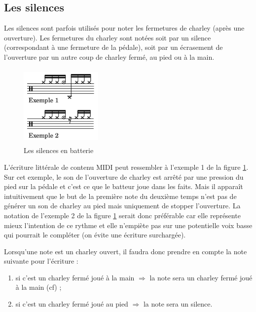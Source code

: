 \subsection*{Les silences}
Les silences sont parfois utilisés pour noter les fermetures de charley (après
une ouverture). Les fermetures du charley sont notées soit par un silence
(correspondant à une fermeture de la pédale), soit par un écrasement de
l’ouverture par un autre coup de charley fermé, au pied ou à la main.

\begin{figure}[h]
	\centering
	\includegraphics[height=40mm, width=40mm]{
    z_images/3_methodes/0_notation_de_la_batterie/5_silence_joue.png}
	\caption{Les silences en batterie}
	\label{silence joue}
\end{figure}

L’écriture littérale de contenu MIDI peut ressembler à l’exemple 1 de la figure
\ref{silence joue}. Sur cet exemple, le son de l’ouverture de charley est
arrêté par une pression du pied sur la pédale et c’est ce que le batteur joue
dans les faits. Mais il apparaît intuitivement que le but de la première note
du deuxième temps n’est pas de générer un son de charley au pied mais
uniquement de stopper l’ouverture. La notation de l’exemple 2 de la figure
\ref{silence joue} serait donc préférable car elle représente mieux l’intention
de ce rythme et elle n’empiète pas sur une potentielle voix basse qui pourrait
le compléter (on évite une écriture surchargée).

Lorsqu’une note est un charley ouvert, il faudra donc prendre en compte la note
suivante pour l’écriture :
\begin{enumerate}
    \item si c’est un charley fermé joué à la main $\Rightarrow$ la note sera
        un charley fermé joué à la main (cf) ;
    \item si c’est un charley fermé joué au pied $\Rightarrow$ la note sera un
        silence.
\end{enumerate}


